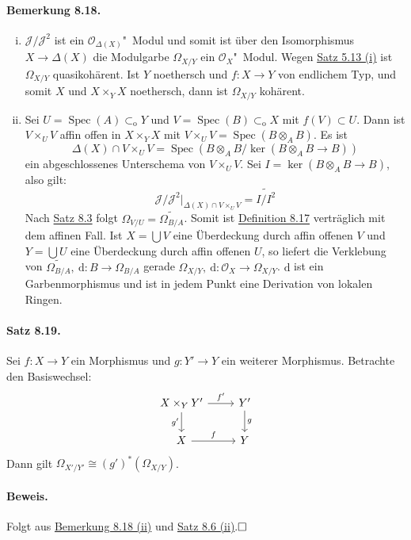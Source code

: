 \documentclass[11pt,b5paper,openany]{memoir}
\def \qed {$\hfill\square$}
\begin{document}
\paragraph{Bemerkung 8.18.}\label{8.18}\begin{enumerate}[(i)]
\item $\mathcal{J}/\mathcal{J}^2$ ist ein $\mathcal{O}_{\Delta(X)}$"~Modul und somit ist über den Isomorphismus $X\to\Delta(X)$ die Modulgarbe $\Omega_{X/Y}$ ein $\mathcal{O}_X$"~Modul. Wegen \hyperref[5.13]{Satz 5.13 (i)} ist $\Omega_{X/Y}$ quasikohärent. Ist $Y$ noethersch und $f:X\to Y$ von endlichem Typ, und somit $X$ und $X\times_YX$ noethersch, dann ist $\Omega_{X/Y}$ kohärent.
\item Sei $U=\operatorname{Spec}(A)\subset_\text{o}Y$ und $V=\operatorname{Spec}(B)\subset_\text{o}X$ mit $f(V)\subset U$. Dann ist $V\times_UV$ affin offen in $X\times_YX$ mit $V\times_UV= \operatorname{Spec}(B\otimes_AB)$. Es ist
\[\Delta(X)\cap V\times_UV = \operatorname{Spec}(B\otimes_AB/\ker(B\otimes_AB\to B)) \]
ein abgeschlossenes Unterschema von $V\times_UV$. Sei $I=\ker(B\otimes_AB\to B)$, also gilt:
\[\mathcal{J}/\mathcal{J}^2|_{\Delta(X)\cap V\times_UV} = \widetilde{I/I^2} \]
Nach \hyperref[8.3]{Satz 8.3} folgt $\Omega_{V/U}=\widetilde{\Omega_{B/A}}$. Somit ist \hyperref[8.17]{Definition 8.17} verträglich mit dem affinen Fall. Ist $X=\bigcup V$ eine Überdeckung durch affin offenen $V$ und $Y=\bigcup U$ eine Überdeckung durch affin offenen $U$, so liefert die Verklebung von $\widetilde{\Omega_{B/A}},\ \mathrm{d}:B\to\Omega_{B/A}$ gerade $\Omega_{X/Y},\ \mathrm{d}:\mathcal{O}_X\to\Omega_{X/Y}$. $\mathrm{d}$ ist ein Garbenmorphismus und ist in jedem Punkt eine Derivation von lokalen Ringen.
\end{enumerate}

\paragraph{Satz 8.19.}\label{8.19} Sei $f:X\to Y$ ein Morphismus und $g:Y'\to Y$ ein weiterer Morphismus. Betrachte den Basiswechsel:
\[\begin{tikzcd}
X\times_YY' \rar["f'"]\dar["g'"'] & Y'\dar["g"]\\
X\rar["f"] & Y
\end{tikzcd} \]
Dann gilt $\Omega_{X'/Y'}\cong (g')^\ast(\Omega_{X/Y})$.

\paragraph{Beweis.} Folgt aus \hyperref[8.18]{Bemerkung 8.18 (ii)} und \hyperref[8.6]{Satz 8.6 (ii)}.\qed
\end{document}
